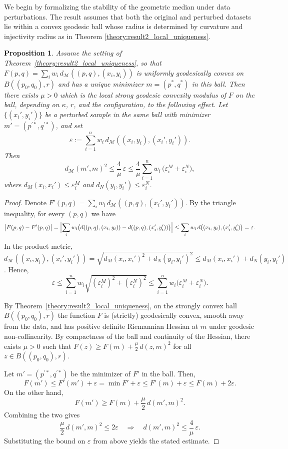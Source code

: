\documentclass[10pt]{article}
\newtheorem{proposition}[theorem]{Proposition}
\newcommand{\calM}{\mathcal{M}}
\begin{document}
We begin by formalizing the stability of the geometric median under data perturbations. The result assumes that both the original and perturbed datasets lie within a convex geodesic ball whose radius is determined by curvature and injectivity radius as in Theorem \ref{theory:result2_local_uniqueness}.


\begin{proposition}\label{theory:robustness_local_robustness}
Assume the setting of Theorem~\ref{theory:result2_local_uniqueness}, so that $F(p,q)=\sum_i w_i\,d_\mathcal{M}((p,q),(x_i,y_i))$ is uniformly geodesically convex on $B((p_0,q_0),r)$ and has a unique minimizer $m=(p^*,q^*)$ in this ball. Then there exists $\mu>0$ which is the local strong geodesic convexity modulus of $F$ on the ball, depending on $\kappa$, $r$, and the configuration, to the following effect. Let $\{(x_i',y_i')\}$ be a perturbed sample in the same ball with minimizer $m'=(p^{\prime *},q^{\prime *})$, and set
\[
\varepsilon:=\sum_{i=1}^n w_i\,d_\mathcal{M} \left((x_i,y_i),(x_i',y_i')\right).
\]
Then
\[
d_\mathcal{M}(m',m)^2 \le \frac{4}{\mu}\,\varepsilon
\le \frac{4}{\mu}\sum_{i=1}^n w_i\,\big(\varepsilon_i^M+\varepsilon_i^N\big),
\]
where $d_M(x_i,x_i')\le \varepsilon_i^M$ and $d_N(y_i,y_i')\le \varepsilon_i^N$.
\end{proposition}

\begin{proof}
Denote $F'(p,q)=\sum_i w_i\,d_\mathcal{M}((p,q),(x_i',y_i'))$. By the triangle inequality, for every $(p,q)$ we have
\[
\bigl|F(p,q)-F'(p,q)\bigr|
=\Bigl|\sum_i w_i\bigl(d((p,q),(x_i,y_i))-d((p,q),(x_i',y_i'))\bigr)\Bigr|
\le \sum_i w_i\, d\bigl((x_i,y_i),(x_i',y_i')\bigr)
= \varepsilon.
\]
In the product metric, $d_\calM((x_i,y_i),(x_i',y_i'))=\sqrt{d_M(x_i,x_i')^2+d_N(y_i,y_i')^2}
\le d_M(x_i,x_i')+d_N(y_i,y_i')$. Hence, 
\[
\varepsilon \le \sum_{i=1}^n w_i\sqrt{(\varepsilon_i^M)^2+(\varepsilon_i^N)^2}
\le \sum_{i=1}^n w_i\bigl(\varepsilon_i^M+\varepsilon_i^N\bigr).
\]

By Theorem~\ref{theory:result2_local_uniqueness}, on the strongly convex ball 
$B((p_0,q_0),r)$ the function $F$ is (strictly) geodesically convex, smooth away from the data, and  has positive definite Riemannian Hessian at $m$ under geodesic non-collinearity. By compactness of the ball and continuity of the Hessian, there exists $\mu>0$ such that $F(z)\ge F(m)+\frac{\mu}{2}\,d(z,m)^2$ for all $z \in B((p_0,q_0),r)$.

Let $m'=(p^{\prime *},q^{\prime *})$ be the minimizer of $F'$ in the ball. Then, 
\[
F(m') \le F'(m')+\varepsilon = \min F' + \varepsilon 
\le F'(m)+\varepsilon \le F(m)+2\varepsilon.
\]
On the other hand, 
\[
F(m') \ge F(m) + \frac{\mu}{2}\, d(m',m)^2.
\]
Combining the two  gives
\[
\frac{\mu}{2}\, d(m',m)^2 \le 2\varepsilon
\quad\Longrightarrow\quad
d(m',m)^2 \le \frac{4}{\mu}\,\varepsilon.
\]
Substituting the bound on $\varepsilon$ from above yields the stated estimate.
\end{proof}
\end{document}
